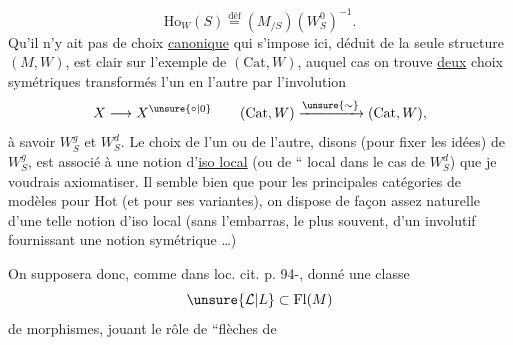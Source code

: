 \[
\mathrm{Ho}_W(S)\overset{\text{déf}}{=}(M_{/S})(W_S^0)^{-1}.
\]
Qu'il n'y ait pas de choix \uline{canonique} qui s'impose ici, déduit de la seule structure $(M,W)$, est clair sur l'exemple de $(\mathrm{Cat},W)$, auquel cas on trouve \uline{deux} choix symétriques transformés l'un en l'autre par l'involution
\[
X\longrightarrow X^{\unsure{\circ|0}}\qquad(\mathrm{Cat},W)\xrightarrow{\unsure{\sim}}(\mathrm{Cat},W),
\]
à savoir $W_S^g$ et $W_S^d$. Le choix de l'un ou de l'autre, disons (pour fixer les idées) de $W_S^g$, est associé à une notion d'\uline{iso local} (ou de `` local dans le cas de $W_S^d$) que je voudrais axiomatiser. Il semble bien que pour les principales catégories de modèles pour $\mathrm{Hot}$ (et pour ses variantes), on dispose de façon assez naturelle d'une telle notion d'iso local (sans l'embarras, le plus souvent, d'un  involutif fournissant une notion symétrique \ldots)

On supposera donc, comme dans loc. cit. p. 94-, donné une classe
\[
\unsure{\mathcal L|L}\subset\mathrm{Fl}(M)
\]
de morphismes, jouant le rôle de ``flèches de
